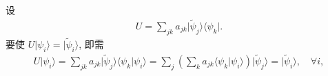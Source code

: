 \documentclass{assignment}
\begin{document}
\begin{sol}
    设
    \begin{align}
        U=\sum_{jk}a_{jk}\lvert\tilde{\psi}_j\rangle\langle\psi_k\rvert.
    \end{align}
    要使 $U\lvert\psi_i\rangle=\lvert\tilde{\psi}_i\rangle$, 即需
    \begin{gather}
        U\lvert\psi_i\rangle=\sum_{jk}a_{jk}\lvert\tilde{\psi}_j\rangle\langle\psi_k\vert\psi_i\rangle=\sum_j\left(\sum_ka_{jk}\langle\psi_k\vert\psi_i\rangle\right)\lvert\tilde{\psi}_j\rangle=\lvert\tilde{\psi}_i\rangle,\quad\forall i,\\

\end{gather}
\end{sol}
\end{document}
